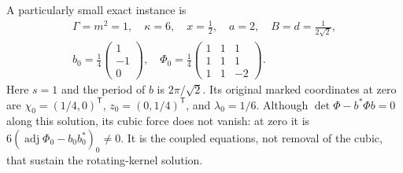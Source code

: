 A particularly small exact instance is
\begin{equation}\label{q444:periodic-instance}
 \begin{gathered}
 \Gamma=m^2=1,\quad\kappa=6,\quad x=\tfrac12,\quad a=2,
 \quad B=d=\frac1{2\sqrt2},\\
 b_0=\frac14\begin{pmatrix}1\\-1\\0\end{pmatrix},\quad
 \Phi_0=\frac14\begin{pmatrix}1&1&1\\1&1&1\\1&1&-2\end{pmatrix}.
 \end{gathered}
\end{equation}
Here $s=1$ and the period of $b$ is $2\pi/\sqrt2$. Its original marked
coordinates at zero are $\chi_0=(1/4,0)^{\mathsf T}$,
$z_0=(0,1/4)^{\mathsf T}$, and $\lambda_0=1/6$.
Although $\det\Phi-b^*\Phi b=0$ along this solution, its cubic force
does not vanish: at zero it is
$6(\operatorname{adj}\Phi_0-b_0b_0^*)_0\ne0$.
It is the coupled equations, not removal of the cubic, that sustain the
rotating-kernel solution.

